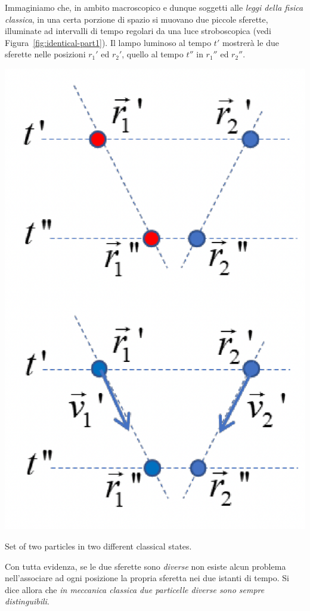 Immaginiamo che, in ambito macroscopico e dunque soggetti alle \emph{leggi della fisica classica}, in una certa porzione di spazio si muovano due piccole sferette, illuminate ad intervalli di tempo regolari da una luce stroboscopica (vedi Figura~\ref{fig:identical-part1}).
Il lampo luminoso al tempo $t'$ mostrerà le due sferette nelle posizioni $r_{1}'$ ed $r_{2}'$, quello al tempo $t''$ in $r_{1}''$ ed $r_{2}''$.
\begin{marginfigure}
    \includegraphics{figs/identical-part1}
    \caption{Set of two particles in two different classical states.}
    \label{fig:identical-part1}
\end{marginfigure}
Con tutta evidenza, se le due sferette sono \emph{diverse} non esiste alcun problema nell’associare ad ogni posizione la propria sferetta nei due istanti di tempo. Si dice allora che \emph{in meccanica classica due particelle diverse sono sempre distinguibili}.

